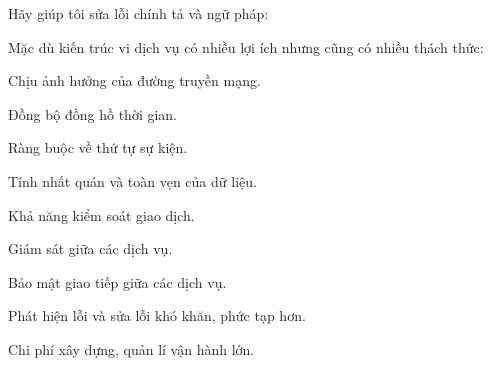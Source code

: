 Hãy giúp tôi sửa lỗi chính tả và ngữ pháp:




Mặc dù kiến trúc vi dịch vụ có nhiều lợi ích nhưng cũng có nhiều thách thức:

Chịu ảnh hưởng của đường truyền mạng.

Đồng bộ đồng hồ thời gian.

Ràng buộc về thứ tự sự kiện.

Tính nhất quán và toàn vẹn của dữ liệu.

Khả năng kiểm soát giao dịch.

Giám sát giữa các dịch vụ.

Bảo mật giao tiếp giữa các dịch vụ.

Phát hiện lỗi và sửa lỗi khó khăn, phức tạp hơn.

Chi phí xây dựng, quản lí vận hành lớn.

